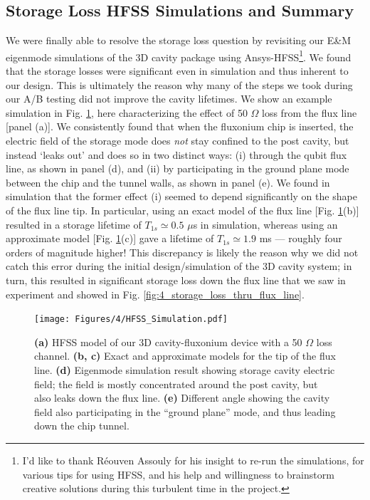 \subsection{Storage Loss HFSS Simulations and Summary}

We were finally able to resolve the storage loss question by revisiting our E\&M eigenmode simulations of the 3D cavity package using Ansys-HFSS\footnote{I'd like to thank R\'eouven Assouly for his insight to re-run the simulations, for various tips for using HFSS, and his help and willingness to brainstorm creative solutions during this turbulent time in the project.}. We found that the storage losses were significant even in simulation and thus inherent to our design. This is ultimately the reason why many of the steps we took during our A/B testing did not improve the cavity lifetimes. We show an example simulation in Fig. \ref{fig:4_HFSS_Simulation}, here characterizing the effect of 50 $\Omega$ loss from the flux line [panel (a)]. We consistently found that when the fluxonium chip is inserted, the electric field of the storage mode does \textit{not} stay confined to the post cavity, but instead `leaks out' and does so in two distinct ways: (i) through the qubit flux line, as shown in panel (d), and (ii) by participating in the ground plane mode between the chip and the tunnel walls, as shown in panel (e). We found in simulation that the former effect (i) seemed to depend significantly on the shape of the flux line tip. In particular, using an exact model of the flux line [Fig. \ref{fig:4_HFSS_Simulation}(b)] resulted in a storage lifetime of $T_{1s} \simeq 0.5$ $\mu$s in simulation, whereas using an approximate model [Fig. \ref{fig:4_HFSS_Simulation}(c)] gave a lifetime of $T_{1s} \simeq 1.9$ ms --- roughly four orders of magnitude higher! This discrepancy is likely the reason why we did not catch this error during the initial design/simulation of the 3D cavity system; in turn, this resulted in significant storage loss down the flux line that we saw in experiment and showed in Fig. \ref{fig:4_storage_loss_thru_flux_line}.

\begin{figure}[t]
    \centering
    \texttt{[image: Figures/4/HFSS\_Simulation.pdf]}
    \caption[HFSS electromagnetic simulations of the 3D cavity-fluxonium architecture showing storage losses inherent to the design.]{\textbf{(a)} HFSS model of our 3D cavity-fluxonium device with a 50 $\Omega$ loss channel. \textbf{(b, c)} Exact and approximate models for the tip of the flux line. \textbf{(d)} Eigenmode simulation result showing storage cavity electric field; the field is mostly concentrated around the post cavity, but also leaks down the flux line. \textbf{(e)} Different angle showing the cavity field also participating in the ``ground plane'' mode, and thus leading down the chip tunnel.}
    \label{fig:4_HFSS_Simulation}
\end{figure}

